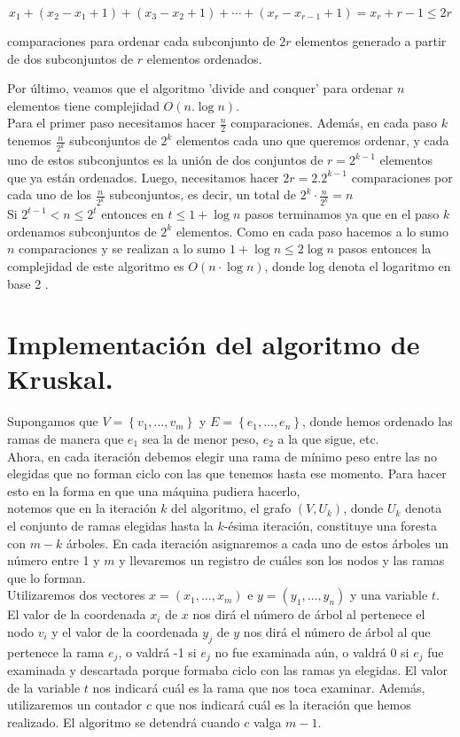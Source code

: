 \documentclass[10pt]{article}
\begin{document}
$$
x_{1}+\left(x_{2}-x_{1}+1\right)+\left(x_{3}-x_{2}+1\right)+\cdots+\left(x_{r}-x_{r-1}+1\right)=x_{r}+r-1 \leq 2 r
$$

comparaciones para ordenar cada subconjunto de $2 r$ elementos generado a partir de dos subconjuntos de $r$ elementos ordenados.

Por último, veamos que el algoritmo 'divide and conquer' para ordenar $n$ elementos tiene complejidad $O(n . \log n)$.\\
Para el primer paso necesitamos hacer $\frac{n}{2}$ comparaciones. Además, en cada paso $k$ tenemos $\frac{n}{2^{k}}$ subconjuntos de $2^{k}$ elementos cada uno que queremos ordenar, y cada uno de estos subconjuntos es la unión de dos conjuntos de $r=2^{k-1}$ elementos que ya están ordenados. Luego, necesitamos hacer $2 r=2.2^{k-1}$ comparaciones por cada uno de los $\frac{n}{2^{k}}$ subconjuntos, es decir, un total de $2^{k} \cdot \frac{n}{2^{k}}=n$\\
Si $2^{t-1}<n \leq 2^{t}$ entonces en $t \leq 1+\log n$ pasos terminamos ya que en el paso $k$ ordenamos subconjuntos de $2^{k}$ elementos. Como en cada paso hacemos a lo sumo $n$ comparaciones y se realizan a lo sumo $1+\log n \leq 2 \log n$ pasos entonces la complejidad de este algoritmo es $O(n \cdot \log n)$, donde log denota el logaritmo en base 2 .

\section*{Implementación del algoritmo de Kruskal.}
Supongamos que $V=\left\{v_{1}, \ldots, v_{m}\right\}$ y $E=\left\{e_{1}, \ldots, e_{n}\right\}$, donde hemos ordenado las ramas de manera que $e_{1}$ sea la de menor peso, $e_{2}$ a la que sigue, etc.\\
Ahora, en cada iteración debemos elegir una rama de mínimo peso entre las no elegidas que no forman ciclo con las que tenemos hasta ese momento. Para hacer esto en la forma en que una máquina pudiera hacerlo,\\
notemos que en la iteración $k$ del algoritmo, el grafo $\left(V, U_{k}\right)$, donde $U_{k}$ denota el conjunto de ramas elegidas hasta la $k$-ésima iteración, constituye una foresta con $m-k$ árboles. En cada iteración asignaremos a cada uno de estos árboles un número entre 1 y $m$ y llevaremos un registro de cuáles son los nodos y las ramas que lo forman.\\
Utilizaremos dos vectores $x=\left(x_{1}, \ldots, x_{m}\right)$ e $y=\left(y_{1}, \ldots, y_{n}\right)$ y una variable $t$. El valor de la coordenada $x_{i}$ de $x$ nos dirá el número de árbol al pertenece el nodo $v_{i}$ y el valor de la coordenada $y_{j}$ de $y$ nos dirá el número de árbol al que pertenece la rama $e_{j}$, o valdrá -1 si $e_{j}$ no fue examinada aún, o valdrá 0 si $e_{j}$ fue examinada y descartada porque formaba ciclo con las ramas ya elegidas. El valor de la variable $t$ nos indicará cuál es la rama que nos toca examinar. Además, utilizaremos un contador $c$ que nos indicará cuál es la iteración que hemos realizado. El algoritmo se detendrá cuando $c$ valga $m-1$.
\end{document}
